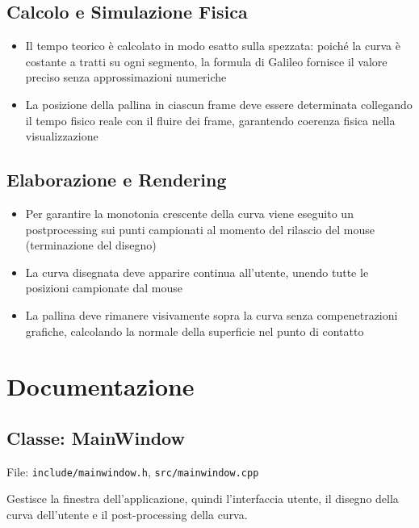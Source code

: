 \documentclass[a4paper,12pt]{article} %
\begin{document}
\subsection{Calcolo e Simulazione Fisica}

\begin{itemize}
    \item Il tempo teorico è calcolato in modo esatto sulla spezzata: poiché la curva è costante a tratti su ogni segmento, la formula di Galileo fornisce il valore preciso senza approssimazioni numeriche
    \item La posizione della pallina in ciascun frame deve essere determinata collegando il tempo fisico reale con il fluire dei frame, garantendo coerenza fisica nella visualizzazione
\end{itemize}

\subsection{Elaborazione e Rendering}

\begin{itemize}
    \item Per garantire la monotonia crescente della curva viene eseguito un postprocessing sui punti campionati al momento del rilascio del mouse (terminazione del disegno)
    \item La curva disegnata deve apparire continua all'utente, unendo tutte le posizioni campionate dal mouse
    \item La pallina deve rimanere visivamente sopra la curva senza compenetrazioni grafiche, calcolando la normale della superficie nel punto di contatto
\end{itemize}

\section{Documentazione}

\subsection{Classe: MainWindow}

\newlength{\oldparindent}
\setlength{\oldparindent}{\parindent}
\parindent=0pt

File: \texttt{include/mainwindow.h}, \texttt{src/mainwindow.cpp}

Gestisce la finestra dell'applicazione, quindi l'interfaccia utente, il disegno della curva dell'utente e il post-processing della curva.
\vspace{1em}
\end{document}
